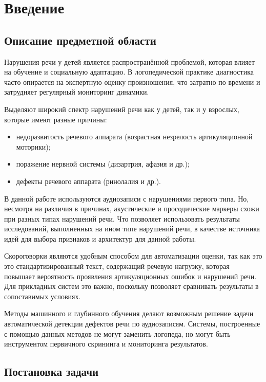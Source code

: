 \documentclass[a4paper,14pt]{extarticle}
\begin{document}
\section{Введение}

\subsection{Описание предметной области}

Нарушения речи у детей является распространённой проблемой, которая влияет на обучение и социальную адаптацию. В логопедической практике диагностика часто опирается на экспертную оценку произношения, что затратно по времени и затрудняет регулярный мониторинг динамики.

Выделяют широкий спектр нарушений речи как у детей, так и у взрослых, которые имеют разные причины: 
\begin{itemize}
    \item недоразвитость речевого аппарата (возрастная незрелость артикуляционной моторики);
    \item поражение нервной системы (дизартрия, афазия и др.);
    \item дефекты речевого аппарата (ринолалия и др.).
\end{itemize}

В данной работе используются аудиозаписи с нарушениями первого типа. Но, несмотря на различия в причинах, акустические и просодические маркеры схожи при разных типах нарушений речи. Что позволяет использовать результаты исследований, выполненных на ином типе нарушений речи, в качестве источника идей для выбора признаков и архитектур для данной работы.

Скороговорки являются удобным способом для автоматизации оценки, так как это это стандартизированный текст, содержащий речевую нагрузку, которая повышает вероятность проявления артикуляционных ошибок и нарушений речи. Для прикладных систем это важно, поскольку позволяет сравнивать результаты в сопоставимых условиях.

Методы машинного и глубинного обучения делают возможным решение задачи автоматической детекции дефектов речи по аудиозаписям. Системы, построенные с помощью данных методов не могут заменить логопеда, но могут быть инструментом первичного скрининга и мониторинга результатов.

\subsection{Постановка задачи}
\end{document}
